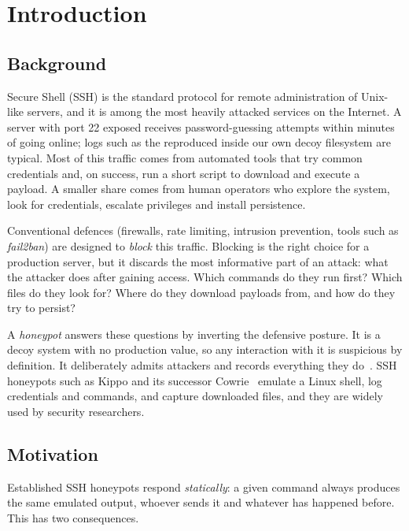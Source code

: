 \chapter{Introduction}
\label{ch:intro}

\section{Background}

Secure Shell (SSH) is the standard protocol for remote administration of Unix-like servers,
and it is among the most heavily attacked services on the Internet. A server with port 22
exposed receives password-guessing attempts within minutes of going online; logs such as
the  reproduced inside our own decoy filesystem are typical. Most of this
traffic comes from automated tools that try common credentials and, on success, run a short
script to download and execute a payload. A smaller share comes from human operators who
explore the system, look for credentials, escalate privileges and install persistence.

Conventional defences (firewalls, rate limiting, intrusion prevention, tools such as
\emph{fail2ban}) are designed to \emph{block} this traffic. Blocking is the right choice for a
production server, but it discards the most informative part of an attack: what the attacker
does after gaining access. Which commands do they run first? Which files do they look for?
Where do they download payloads from, and how do they try to persist?

A \emph{honeypot} answers these questions by inverting the defensive posture. It is a decoy
system with no production value, so any interaction with it is suspicious by definition. It
deliberately admits attackers and records everything they do~\cite{spitzner2002honeypots}.
SSH honeypots such as Kippo and its successor Cowrie~\cite{cowrie} emulate a Linux shell,
log credentials and commands, and capture downloaded files, and they are widely used by
security researchers.

\section{Motivation}

Established SSH honeypots respond \emph{statically}: a given command always produces the same
emulated output, whoever sends it and whatever has happened before. This has two consequences.

